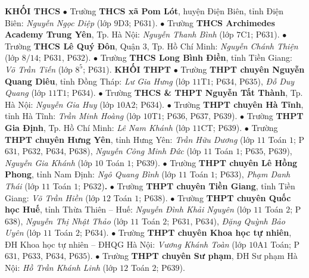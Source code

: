 \begin{multicols}{2}
	\textbf{\color{thachthuctoanhoc}KHỐI THCS}
	\vskip 0.05cm
	$\bullet$ Trường \textbf{\color{thachthuctoanhoc}THCS xã Pom Lót}, huyện Điện Biên, tỉnh Điện Biên: \textit{Nguyễn Ngọc Diệp} (lớp $9$D$3$; P$631$).
	\vskip 0.05cm
	$\bullet$ Trường \textbf{\color{thachthuctoanhoc}THCS Archimedes Academy Trung Yên}, Tp. Hà Nội: \textit{Nguyễn Thanh Bình} (lớp $7$C$1$; P$631$).
	\vskip 0.05cm
	$\bullet$ Trường \textbf{\color{thachthuctoanhoc}THCS Lê Quý Đôn}, Quận $3$, Tp. Hồ Chí Minh: \textit{Nguyễn Chánh Thiện} (lớp $8/14$; P$631$, P$632$).
	\vskip 0.05cm
	$\bullet$ Trường \textbf{\color{thachthuctoanhoc}THCS Long Bình Điền}, tỉnh Tiền Giang: \textit{Võ Trần Tiến} (lớp $8^5$;  P$631$).
	\vskip 0.05cm
	\textbf{\color{thachthuctoanhoc}KHỐI THPT}
	\vskip 0.05cm
	$\bullet$ Trường \textbf{\color{thachthuctoanhoc}THPT chuyên Nguyễn Quang Diêu}, tỉnh Đồng Tháp: \textit{Lư Gia Hưng} (lớp $11$T$1$; P$634$, P$635$), \textit{Đỗ Duy Quang} (lớp $11$T$1$; P$634$).
	\vskip 0.05cm
	$\bullet$ Trường \textbf{\color{thachthuctoanhoc}THCS \& THPT Nguyễn Tất Thành}, Tp. Hà Nội: \textit{Nguyễn Gia Huy} (lớp $10$A$2$; P$634$).
	\vskip 0.05cm
	$\bullet$ Trường \textbf{\color{thachthuctoanhoc}THPT chuyên Hà Tĩnh}, tỉnh Hà Tĩnh: \textit{Trần Minh Hoàng} (lớp $10$T$1$; P$636$, P$637$, P$639$).
	\vskip 0.05cm
	$\bullet$ Trường \textbf{\color{thachthuctoanhoc}THPT Gia Định}, Tp. Hồ Chí Minh: \textit{Lê Nam Khánh} (lớp $11$CT; P$639$).
	\vskip 0.05cm
	$\bullet$ Trường \textbf{\color{thachthuctoanhoc}THPT chuyên Hưng Yên}, tỉnh Hưng Yên: \textit{Trần Hữu Dương} (lớp $11$ Toán $1$; P$631$, P$632$, P$634$, P$638$), \textit{Nguyễn Công Minh Đức} (lớp $11$ Toán $1$; P$635$, P$639$), \textit{Nguyễn Gia Khánh} (lớp $10$ Toán $1$; P$639$).
	\vskip 0.05cm
	$\bullet$ Trường \textbf{\color{thachthuctoanhoc}THPT chuyên Lê Hồng Phong}, tỉnh Nam Định: \textit{Ngô Quang Bình} (lớp $11$ Toán $1$; P$633$), \textit{Phạm Danh Thái} (lớp $11$ Toán $1$; P$632$)\textbf{\color{thachthuctoanhoc}.}
	\vskip 0.05cm
	$\bullet$ Trường \textbf{\color{thachthuctoanhoc}THPT chuyên Tiền Giang}, tỉnh Tiền Giang: \textit{Võ Trần Hiền} (lớp $12$ Toán $1$; P$638$).
	\vskip 0.05cm
	$\bullet$ Trường \textbf{\color{thachthuctoanhoc}THPT chuyên Quốc học Huế}, tỉnh Thừa Thiên -- Huế: \textit{Nguyễn Đình Khải Nguyên} (lớp $11$ Toán $2$; P$638$), \textit{Nguyễn Thị Nhật Thảo} (lớp $11$ Toán $2$; P$631$, P$634$), \textit{Đặng Quỳnh Bảo Uyên} (lớp $11$ Toán $2$; P$634$).
	\vskip 0.05cm
	$\bullet$ Trường \textbf{\color{thachthuctoanhoc}THPT chuyên Khoa học tự nhiên}, ĐH Khoa học tự nhiên -- ĐHQG Hà Nội: \textit{Vương Khánh Toàn} (lớp $10$A$1$ Toán; P$631$, P$633$, P$634$, P$635$).
	\vskip 0.05cm
	$\bullet$ Trường \textbf{\color{thachthuctoanhoc}THPT chuyên Sư phạm}, ĐH Sư phạm Hà Nội: \textit{Hồ Trần Khánh Linh} (lớp $12$ Toán $2$; P$639$).
\end{multicols}

